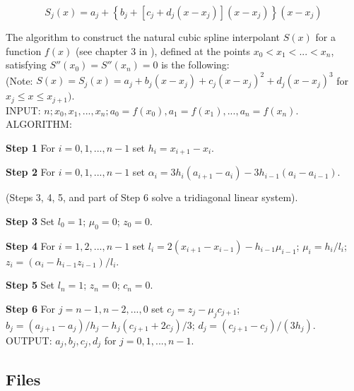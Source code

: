 \documentclass{article}
\begin{document}
\begin{equation}
	S_j(x)=a_j+\left\{b_j+\left[c_j+d_j(x-x_j)\right](x-x_j)\right\}(x-x_j)
\end{equation} 


The algorithm to construct the natural cubic spline interpolant $S(x)$ for a function $f(x)$ (see chapter 3 in \cite{BurFai11}), defined at the points $x_0 < x_1 < ... < x_n$, satisfying $S''(x_0) = S''(x_n) = 0$ is the following:\\

(Note: $S(x) = S_j(x) = a_j + b_j(x-x_j) + c_j(x-x_j)^2 + d_j(x -x_j)^3$ for $x_j \le x \le x_{j+1}).$\\

INPUT: $n; x_0, x_1, ... , x_n; a_0 = f(x_0), a_1 = f (x_1), ... , a_n = f (x_n).$\\

ALGORITHM:

\textbf{Step 1} For $i = 0, 1, ... , n-1$ set $h_i = x_{i+1}-x_i$.

\textbf{Step 2} For $i = 0, 1, ... , n-1$ set $\alpha_i = 3h_i(a_{i+1}-a_i)-3h_{i-1}(a_i-a_{i-1})$.

(Steps 3, 4, 5, and part of Step 6 solve a tridiagonal linear system).

\textbf{Step 3} Set $l_0 = 1$; $\mu_0 = 0$; $z_0 = 0$.

\textbf{Step 4} For $i = 1, 2, . . . , n-1$ set $l_i = 2(x_{i+1}-x_{i-1})-h_{i-1}\mu_{i-1}$; $\mu_i = h_i/l_i$; $z_i = (\alpha_i-h_{i-1}z_{i-1})/l_i$.

\textbf{Step 5} Set $l_n = 1$; $z_n = 0$; $c_n = 0$.

\textbf{Step 6}  For $j = n-1, n-2, ... , 0$ set $c_j = z_j- \mu_jc_{j+1}$;
$b_j = (a_{j+1}-a_j)/h_j-h_j(c_{j+1} + 2c_j)/3$;
$d_j = (c_{j+1}-c_j)/(3h_j)$.\\

OUTPUT: $a_j,b_j,c_j,d_j$ for $j=0,1,...,n-1$.



\subsection{Files}
\end{document}

